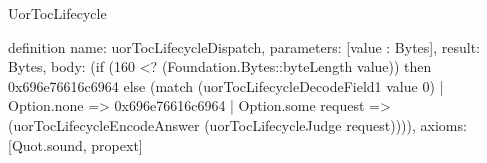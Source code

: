 \begin{lexlean}{UorTocLifecycle}
\begin{semanticmodule}
definition{
  name: uorTocLifecycleDispatch,
  parameters: [value : Bytes],
  result: Bytes,
  body: (if (160 <? (Foundation.Bytes::byteLength value)) then 0x696e76616c6964 else (match (uorTocLifecycleDecodeField1 value 0)
    | Option.none => 0x696e76616c6964
    | Option.some request => (uorTocLifecycleEncodeAnswer (uorTocLifecycleJudge request)))),
  axioms: [Quot.sound, propext]
}
\end{semanticmodule}
\end{lexlean}
